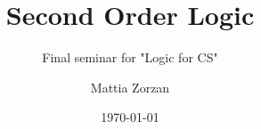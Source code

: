 \documentclass{beamer}
\title{Second Order Logic}
\subtitle{Final seminar for "Logic for CS"}
\author{Mattia Zorzan}
\institute{University of Verona}
\date{\today}
\begin{document}
    \begin{frame}
        \titlepage
    \end{frame}
\end{document}
